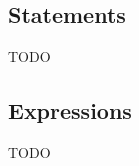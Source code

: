 \documentclass[10pt]{article}
\begin{document}
\subsection{Statements}
\label{sec:code-gen:statements}

TODO

\subsection{Expressions}
\label{sec:code-gen:expressions}

TODO


\begin{comment}
If no backslash character appears after the second double-quote, then
the string is null-terminated:  in addition to storing the characters
appearing in the double-quotes, it stores a terminating NUL character
(value \$00).  If a backslash character appears after the second
double-quote, then the string is unterminated:  only the characters
appearing between the double-quotes are stored.
\end{comment}
\end{document}
